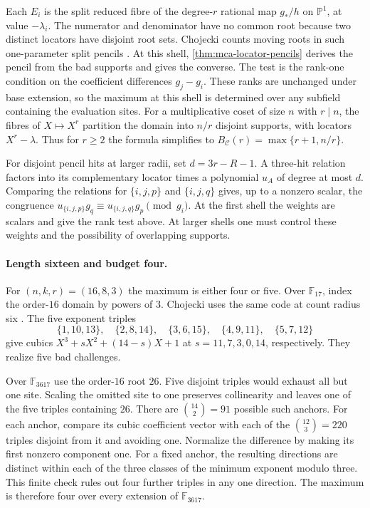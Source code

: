 Each \(E_i\) is the split reduced fibre of the degree-\(r\) rational map
\(g_*/h\) on \(\mathbb P^1\), at value \(-\lambda_i\). The numerator and
denominator have no common root because two distinct locators have disjoint
root sets. Chojecki counts moving roots in such one-parameter split
pencils \cite[Moving-root bound]{chojecki2026grandeFinale}. At this shell,
\cref{thm:mca-locator-pencils} derives the pencil from the bad supports
and gives the converse. The test is the
rank-one condition on the coefficient differences \(g_j-g_i\). These
ranks are unchanged under base extension, so the maximum at this shell
is determined over any subfield containing the evaluation sites.
For a multiplicative coset of size \(n\) with \(r\mid n\), the fibres of
\(X\mapsto X^r\) partition the domain into \(n/r\) disjoint supports, with
locators \(X^r-\lambda\). Thus for \(r\ge2\) the formula simplifies to
\(B_{\mathcal C}(r)=\max\{r+1,n/r\}\).

For disjoint pencil hits at larger radii, set \(d=3r-R-1\).
A three-hit relation factors into its complementary locator times a
polynomial \(u_A\) of degree at most \(d\). Comparing the relations for
\(\{i,j,p\}\) and \(\{i,j,q\}\) gives, up to a nonzero scalar, the congruence
\(u_{\{i,j,p\}}g_q\equiv u_{\{i,j,q\}}g_p\pmod{g_i}\). At the first shell
the weights are scalars and give the rank test above. At larger shells
one must control these weights and the possibility of overlapping supports.

\paragraph{Length sixteen and budget four.}
For \((n,k,r)=(16,8,3)\) the maximum is either four or five. Over
\(\mathbb F_{17}\), index the order-\(16\) domain by powers of \(3\).
Chojecki uses the same code at count radius six
\cite[Exact dyadic critical spread core]{chojecki2026grandeFinale}.
The five exponent triples
\[
 \{1,10,13\},\quad \{2,8,14\},\quad \{3,6,15\},\quad
 \{4,9,11\},\quad \{5,7,12\}
\]
give cubics \(X^3+sX^2+(14-s)X+1\) at
\(s=11,7,3,0,14\), respectively. They realize five bad challenges.

Over \(\mathbb F_{3617}\) use the order-\(16\) root \(26\). Five disjoint
triples would exhaust all but one site. Scaling the omitted site to one
preserves collinearity and leaves one of the five triples containing
\(26\). There are \(\binom{14}{2}=91\) possible such anchors. For each
anchor, compare its cubic coefficient vector with each of the
\(\binom{12}{3}=220\) triples disjoint from it and avoiding one.
Normalize the difference by making its first nonzero component one.
For a fixed anchor, the resulting directions are distinct within each
of the three classes of the minimum exponent modulo three. This finite
check rules out four further triples in any one direction. The maximum
is therefore four over every extension of \(\mathbb F_{3617}\).

